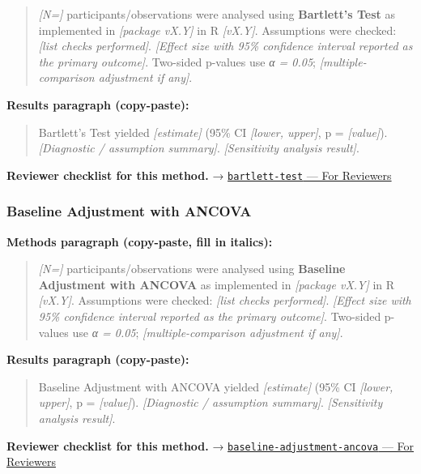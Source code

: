\documentclass[
]{article}
\begin{document}
\begin{quote}
\emph{{[}N={]}} participants/observations were analysed using
\textbf{Bartlett's Test} as implemented in \emph{{[}package vX.Y{]}} in
R \emph{{[}vX.Y{]}}. Assumptions were checked: \emph{{[}list checks
performed{]}}. \emph{{[}Effect size with 95\% confidence interval
reported as the primary outcome{]}}. Two-sided p-values use \emph{α =
0.05}; \emph{{[}multiple-comparison adjustment if any{]}}.
\end{quote}

\textbf{Results paragraph (copy-paste):}

\begin{quote}
Bartlett's Test yielded \emph{{[}estimate{]}} (95\% CI \emph{{[}lower,
upper{]}}, p = \emph{{[}value{]}}). \emph{{[}Diagnostic / assumption
summary{]}}. \emph{{[}Sensitivity analysis result{]}}.
\end{quote}

\textbf{Reviewer checklist for this method.} →
\href{../chapters/04-inferential/bartlett-test.Rmd\#for-reviewers}{\texttt{bartlett-test}
--- For Reviewers}

\subsubsection{Baseline Adjustment with
ANCOVA}\label{baseline-adjustment-with-ancova}

\textbf{Methods paragraph (copy-paste, fill in italics):}

\begin{quote}
\emph{{[}N={]}} participants/observations were analysed using
\textbf{Baseline Adjustment with ANCOVA} as implemented in
\emph{{[}package vX.Y{]}} in R \emph{{[}vX.Y{]}}. Assumptions were
checked: \emph{{[}list checks performed{]}}. \emph{{[}Effect size with
95\% confidence interval reported as the primary outcome{]}}. Two-sided
p-values use \emph{α = 0.05}; \emph{{[}multiple-comparison adjustment if
any{]}}.
\end{quote}

\textbf{Results paragraph (copy-paste):}

\begin{quote}
Baseline Adjustment with ANCOVA yielded \emph{{[}estimate{]}} (95\% CI
\emph{{[}lower, upper{]}}, p = \emph{{[}value{]}}). \emph{{[}Diagnostic
/ assumption summary{]}}. \emph{{[}Sensitivity analysis result{]}}.
\end{quote}

\textbf{Reviewer checklist for this method.} →
\href{../chapters/14-clinical/baseline-adjustment-ancova.Rmd\#for-reviewers}{\texttt{baseline-adjustment-ancova}
--- For Reviewers}
\end{document}
